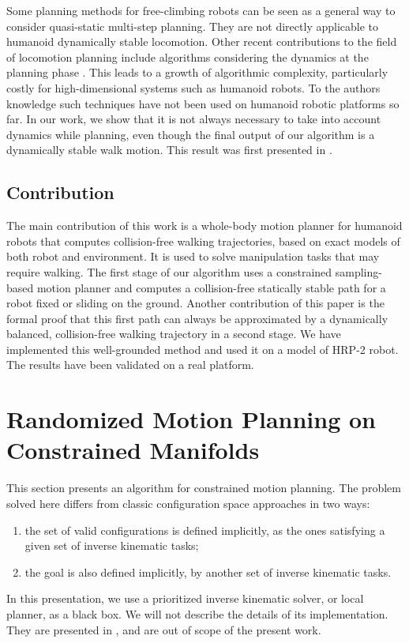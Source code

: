 \documentclass{article}
\begin{document}
Some planning methods for free-climbing robots \cite{bretl2006motion}
can be seen as a general way 
to consider quasi-static multi-step planning. They are not directly applicable to
humanoid dynamically stable locomotion.
Other recent contributions to the field of locomotion planning  include algorithms 
considering the dynamics at the planning phase \cite{shkolnik2011bounding}. This leads to 
a growth of algorithmic complexity, particularly costly for high-dimensional
systems such as humanoid robots. To the authors knowledge such techniques have not been
used on humanoid robotic platforms so far.
In our work, we show that it is not always
necessary to take into account dynamics while planning, even though the final
output of our algorithm is a dynamically stable walk motion. This result was first
presented in \cite{dalibard2011small}.



\subsection{Contribution}

The main contribution of this work is a  whole-body motion planner for humanoid robots
that computes collision-free walking trajectories, based on
exact models of both robot and environment. It is used to solve manipulation tasks
that may require walking. The first stage of our algorithm uses a
constrained sampling-based motion 
planner and  computes a collision-free  statically stable path  for a robot fixed or sliding 
on the ground. Another  contribution of this  paper is the formal  proof that
this first path can always be  approximated by a dynamically balanced, collision-free
walking  trajectory in a second stage. We have implemented this well-grounded 
method and  used it on a model of  HRP-2 robot.  The results have been  
validated on a real platform.

\section{Randomized Motion Planning on Constrained Manifolds}
\label{sec:wb}

This section presents an algorithm for constrained motion planning. 
The problem solved here
differs from classic configuration space approaches in two ways:
\begin{enumerate}
\item the set of valid configurations is defined implicitly, as the ones satisfying a given 
  set of inverse kinematic tasks;
\item the goal is also defined implicitly, by another set of inverse kinematic tasks.
\end{enumerate}
In this presentation, we use a prioritized inverse kinematic solver, or local planner,
 as a black box. We will not describe the details of its implementation. They are presented in 
\cite{yoshida2006tds}, and are out of scope of the present work.
\end{document}
